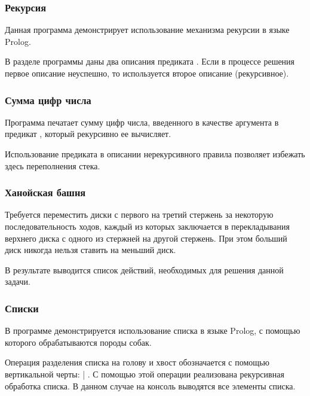 \subsubsection{Рекурсия}

Данная программа демонстрирует использование механизма рекурсии в языке Prolog. 


\noindent В разделе  программы даны два описания предиката . Если в процессе решения первое описание неуспешно, то используется второе описание (рекурсивное).

\subsubsection{Сумма цифр числа}

Программа печатает сумму цифр числа, введенного в качестве аргумента в предикат , который рекурсивно ее вычисляет.


Использование предиката \code{!} в описании нерекурсивного правила позволяет избежать здесь переполнения стека.

\subsubsection{Ханойская башня}

Требуется переместить диски с первого на третий стержень за некоторую последовательность ходов, каждый из которых заключается в перекладывания верхнего диска с одного из стержней на другой стержень. При этом больший диск никогда нельзя ставить на меньший диск.


В результате выводится список действий, необходимых для решения данной задачи.

\subsubsection{Списки}

В программе демонстрируется использование списка в языке Prolog, с помощью которого обрабатываются породы собак.


Операция разделения списка на голову и хвост обозначается с помощью вертикальной черты: \code{[Head} | \code{Tail]}. С помощью этой операции реализована рекурсивная обработка списка. В данном случае на консоль выводятся все элементы списка.

